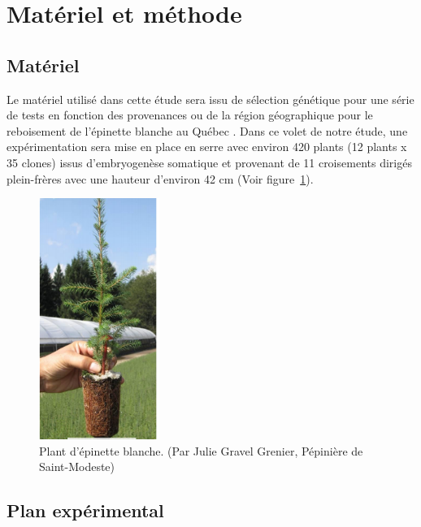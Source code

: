 \documentclass[a4paper,12pt]{report}
\begin{document}
\section{Matériel et méthode}

\subsection*{Matériel}

Le matériel utilisé dans cette étude sera issu de sélection génétique pour une série de tests en fonction des provenances ou de la région géographique pour le reboisement de l'épinette blanche au Québec \citep{Beaulieu1996}. Dans ce volet de notre étude, une expérimentation sera mise en place en serre avec environ 420 plants (12 plants x 35 clones) issus d'embryogenèse somatique et provenant de 11 croisements dirigés plein-frères avec une hauteur d'environ 42 cm (Voir figure~\ref{plant}).  \\


\begin{figure}
	
	\centering
	\includegraphics[width=0.35\textwidth]{plant_epinette.png}
	\caption{Plant d'épinette blanche. (Par Julie Gravel Grenier, Pépinière de Saint-Modeste)}
	\label{plant}	
	
\end{figure}

\subsection*{Plan expérimental}
\end{document}
